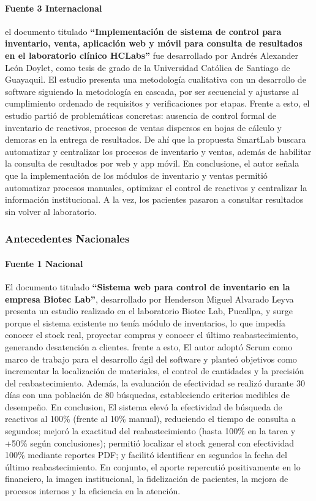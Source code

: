 \documentclass[12pt]{article} %
\begin{document}
\paragraph{Fuente 3 Internacional}

el documento titulado \textbf{“Implementación de sistema de control para inventario, venta, aplicación web y móvil para consulta de resultados en el laboratorio clínico HCLabs”} fue desarrollado por Andrés Alexander León Doylet, como tesis de grado de la Universidad Católica de Santiago de Guayaquil. El estudio presenta una metodología cualitativa con un desarrollo de software siguiendo la metodología en cascada, por ser secuencial y ajustarse al cumplimiento ordenado de requisitos y verificaciones por etapas. Frente a esto, el estudio partió de problemáticas concretas: ausencia de control formal de inventario de reactivos, procesos de ventas dispersos en hojas de cálculo y demoras en la entrega de resultados. De ahí que la propuesta SmartLab buscara automatizar y centralizar los procesos de inventario y ventas, además de habilitar la consulta de resultados por web y app móvil. En conclusione, el autor señala que la implementación de los módulos de inventario y ventas permitió automatizar procesos manuales, optimizar el control de reactivos y centralizar la información institucional. A la vez, los pacientes pasaron a consultar resultados sin volver al laboratorio.

\subsubsection{Antecedentes Nacionales}

\paragraph{Fuente 1 Nacional}

El documento titulado \textbf{“Sistema web para control de inventario en la empresa Biotec Lab”}, desarrollado por Henderson Miguel Alvarado Leyva presenta un estudio realizado en el laboratorio Biotec Lab, Pucallpa, y surge porque el sistema existente no tenía módulo de inventarios, lo que impedía conocer el stock real, proyectar compras y conocer el último reabastecimiento, generando desatención a clientes. frente a esto, El autor adoptó Scrum como marco de trabajo para el desarrollo ágil del software y planteó objetivos como incrementar la localización de materiales, el control de cantidades y la precisión del reabastecimiento. Además, la evaluación de efectividad se realizó durante 30 días con una población de 80 búsquedas, estableciendo criterios medibles de desempeño. En conclusion, El sistema elevó la efectividad de búsqueda de reactivos al 100\% (frente al 10\% manual), reduciendo el tiempo de consulta a segundos; mejoró la exactitud del reabastecimiento (hasta 100\% en la tarea y +50\% según conclusiones); permitió localizar el stock general con efectividad 100\% mediante reportes PDF; y facilitó identificar en segundos la fecha del último reabastecimiento. En conjunto, el aporte repercutió positivamente en lo financiero, la imagen institucional, la fidelización de pacientes, la mejora de procesos internos y la eficiencia en la atención.
\end{document}
